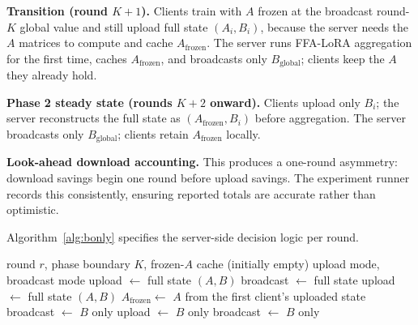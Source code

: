 \documentclass[iicol,pdflatex,sn-mathphys-num]{sn-jnl}
\begin{document}
\textbf{Transition (round $K{+}1$).}
Clients train with $A$ frozen at the broadcast round-$K$ global value and still upload full state $(A_i, B_i)$, because the server needs the $A$ matrices to compute and cache $A_{\text{frozen}}$. The server runs FFA-LoRA \cite{sun2024ffalora} aggregation for the first time, caches $A_{\text{frozen}}$, and broadcasts only $B_{\text{global}}$; clients keep the $A$ they already hold.

\textbf{Phase 2 steady state (rounds $K{+}2$ onward).}
Clients upload only $B_i$; the server reconstructs the full state as $(A_{\text{frozen}}, B_i)$ before aggregation. The server broadcasts only $B_{\text{global}}$; clients retain $A_{\text{frozen}}$ locally.

\textbf{Look-ahead download accounting.}
This produces a one-round asymmetry: download savings begin one round before upload savings. The experiment runner records this consistently, ensuring reported totals are accurate rather than optimistic.

Algorithm~\ref{alg:bonly} specifies the server-side decision logic per round.

\begin{algorithm}[t]
\centering
\caption{Bidirectional B-only protocol (server, per round)}
\label{alg:bonly}
\footnotesize
\begin{algorithmic}[1]
\Require round $r$, phase boundary $K$, frozen-$A$ cache (initially empty)
\Ensure upload mode, broadcast mode
 
    \State upload $\leftarrow$ full state $(A, B)$
    \State broadcast $\leftarrow$ full state
 
    \State upload $\leftarrow$ full state $(A, B)$
    \State $A_{\text{frozen}} \leftarrow$ $A$ from the first client's uploaded state
    \State broadcast $\leftarrow$ $B$ only 
\Else {}
    \State upload $\leftarrow$ $B$ only 
    \State broadcast $\leftarrow$ $B$ only 
\EndIf
\end{algorithmic}
\end{algorithm}
\end{document}
